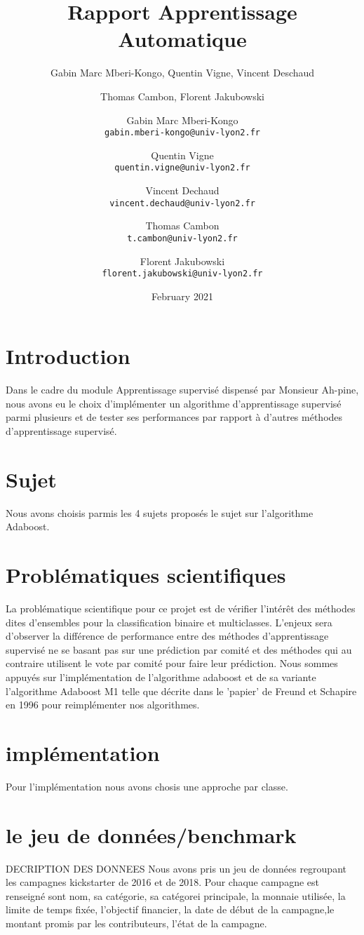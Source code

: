 \documentclass{article}
\title{Rapport Apprentissage Automatique}
\author{Gabin Marc Mberi-Kongo, Quentin Vigne, Vincent Deschaud}
\author{Thomas Cambon, Florent Jakubowski }
\author{
  Gabin Marc Mberi-Kongo\\
  \texttt{gabin.mberi-kongo@univ-lyon2.fr}
  \and
  Quentin Vigne\\
  \texttt{quentin.vigne@univ-lyon2.fr}
  \and
  Vincent Dechaud\\
  \texttt{vincent.dechaud@univ-lyon2.fr}
  \and
  Thomas Cambon\\
  \texttt{t.cambon@univ-lyon2.fr}
  \and
  Florent Jakubowski\\
  \texttt{florent.jakubowski@univ-lyon2.fr}
}
\date{February 2021}
\begin{document}
\maketitle

\tableofcontents

\section{Introduction}

Dans le cadre du module Apprentissage supervisé dispensé par Monsieur Ah-pine, nous avons eu le choix d'implémenter un algorithme d'apprentissage supervisé parmi plusieurs et de tester ses performances par rapport à d'autres méthodes d'apprentissage supervisé. 

\section{Sujet}
Nous avons choisis parmis les 4 sujets proposés le sujet sur l'algorithme Adaboost.
\section{Problématiques scientifiques}
La problématique scientifique pour ce projet est de vérifier l'intérêt des méthodes dites d'ensembles pour la classification binaire et multiclasses. L'enjeux sera d'observer la différence de performance entre des méthodes d'apprentissage supervisé ne se basant pas sur une prédiction par comité et des méthodes qui au contraire utilisent le vote par comité pour faire leur prédiction.
Nous sommes appuyés sur l'implémentation de l'algorithme adaboost et de sa variante l'algorithme Adaboost M1 telle que décrite dans le 'papier' de Freund et Schapire \citep{FreundSchapire1996} en 1996 pour reimplémenter nos algorithmes.

\section{implémentation}
Pour l'implémentation nous avons chosis une approche par classe.
\section{le jeu de données/benchmark}

DECRIPTION DES DONNEES 
Nous avons pris un jeu de données regroupant les campagnes kickstarter de 2016 et de 2018. 
Pour chaque campagne est renseigné sont nom, sa catégorie, sa catégorei principale, la monnaie utilisée, la limite de temps fixée, l'objectif financier, la date de début de la campagne,le montant promis par les contributeurs, l'état de la campagne. 
\end{document}

